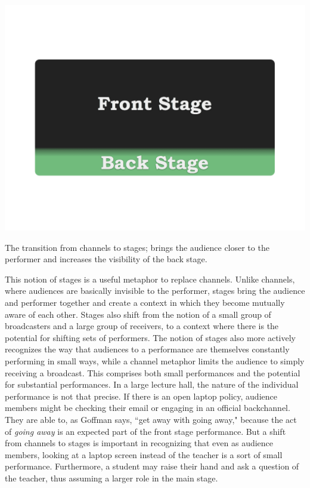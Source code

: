 \begin{marginfigure}
	\includegraphics{figures/front-stage-back-stage.png}
	\caption{The transition from channels to stages; brings the audience closer to the performer and increases the visibility of the back stage.}
	\label{fig:front-back-stage}
\end{marginfigure}

This notion of stages is a useful metaphor to replace channels. Unlike channels, where audiences are basically invisible to the performer, stages bring the audience and performer together and create a context in which they become mutually aware of each other. Stages also shift from the notion of a small group of broadcasters and a large group of receivers, to a context where there is the potential for shifting sets of performers. The notion of stages also more actively recognizes the way that audiences to a performance are themselves constantly performing in small ways, while a channel metaphor limits the audience to simply receiving a broadcast. This comprises both small performances and the potential for substantial performances. In a large lecture hall, the nature of the individual performance is not that precise. If there is an open laptop policy, audience members might be checking their email or engaging in an official backchannel.  They are able to, as Goffman says, ``get away with going away," because the act of \emph{going away} is an expected part of the front stage performance. But a shift from channels to stages is important in recognizing that even as audience members, looking at a laptop screen instead of the teacher is a sort of small performance. Furthermore, a student may raise their hand and ask a question of the teacher, thus assuming a larger role in the main stage. 

